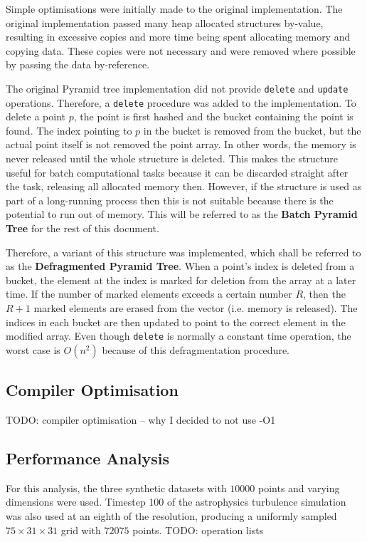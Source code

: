 Simple optimisations were initially made to the original implementation. The original implementation passed many heap allocated structures by-value, resulting in excessive copies and more time being spent allocating memory and copying data. These copies were not necessary and were removed where possible by passing the data by-reference.

The original Pyramid tree implementation did not provide \texttt{delete} and \texttt{update} operations. Therefore, a \texttt{delete} procedure was added to the implementation. To delete a point $p$, the point is first hashed and the bucket containing the point is found. The index pointing to $p$ in the bucket is removed from the bucket, but the actual point itself is not removed the point array. In other words, the memory is never released until the whole structure is deleted. This makes the structure useful for batch computational tasks because it can be discarded straight after the task, releasing all allocated memory then. However, if the structure is used as part of a long-running process then this is not suitable because there is the potential to run out of memory. This will be referred to as the \textbf{Batch Pyramid Tree} for the rest of this document.

Therefore, a variant of this structure was implemented, which shall be referred to as the \textbf{Defragmented Pyramid Tree}. When a point's index is deleted from a bucket, the element at the index is marked for deletion from the array at a later time. If the number of marked elements exceeds a certain number $R$, then the $R + 1$ marked elements are erased from the vector (i.e. memory is released). The indices in each bucket are then updated to point to the correct element in the modified array. Even though \texttt{delete} is normally a constant time operation, the worst case is $O(n^2)$ because of this defragmentation procedure.

\subsection{Compiler Optimisation}

TODO: compiler optimisation -- why I decided to not use -O1 

\subsection{Performance Analysis}

For this analysis, the three synthetic datasets with $10000$ points and varying dimensions were used. Timestep 100 of the astrophysics turbulence simulation was also used at an eighth of the resolution, producing a uniformly sampled $75 \times 31 \times 31$ grid with $72075$ points. TODO: operation lists

